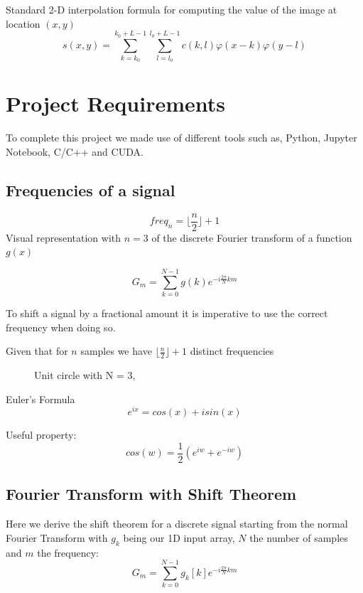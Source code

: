 \documentclass[]{usiinfbachelorproject}
\begin{document}
	Standard 2-D interpolation formula for computing the value of the image at location $(x,y)$
	\begin{equation}
		s(x,y) = \sum_{k = k_0}^{k_0+L-1}\sum_{l=l_0}^{l_0+L-1} c(k,l)\varphi(x-k)\varphi(y-l)
	\end{equation}
	
	\fi
	

	\section{Project Requirements}
	To complete this project we made use of different tools such as, Python, Jupyter Notebook, C/C++ and CUDA.
	
	
	
	\subsection{Frequencies of a signal}
	\begin{equation}
		freq_{n} = \lfloor \frac{n}{2} \rfloor + 1
	\end{equation}
	Visual representation with $n=3$ of the discrete Fourier transform of a function $g(x)$
	
	\begin{equation*}
		G_m = \displaystyle\sum_{k=0}^{N-1}g(k)e^{-i \frac{2\pi}{N}km}
	\end{equation*}
	
	To shift a signal by a fractional amount it is imperative to use the correct frequency when doing so.
	
	Given that for $n$ samples we have $\lfloor \frac{n}{2} \rfloor + 1$ distinct frequencies
	
	
	\begin{figure}
		\centering
		
		\caption{Unit circle with N = 3, }
	\end{figure}
	
	Euler's Formula
	\begin{equation}
		e^{ix} = cos(x)  + i sin(x)
	\end{equation}
	
	Useful property:
	\begin{equation}
		cos(w)= \frac{1}{2}(e^{iw}+ e^{-iw})
	\end{equation}
	
	
	\subsection{Fourier Transform with Shift Theorem}
	Here we derive the shift theorem for a discrete signal starting from the normal Fourier Transform with $g_k$ being our 1D input array, $N$ the number of samples and $m$ the frequency:
	\begin{equation*}
		G_m = \displaystyle\sum_{k=0}^{N-1}g_k[k]e^{-i \frac{2\pi}{N} km}
	\end{equation*}
	
\end{document}
